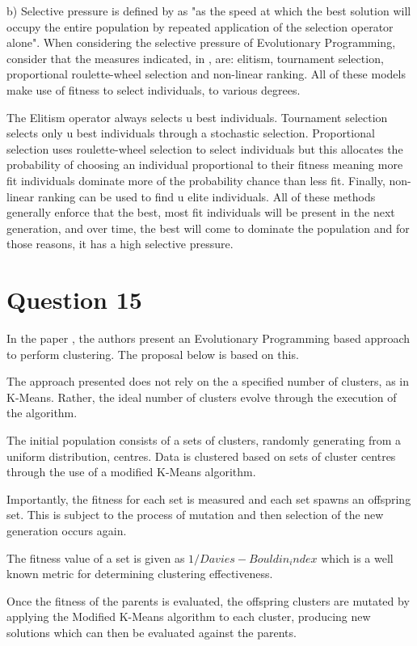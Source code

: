 \documentclass[12pt]{article}
\begin{document}
	b)  Selective pressure is defined by \cite{back_1994} as "as the speed at which the best solution will occupy the entire population by repeated application of the selection operator alone". When considering the selective pressure of Evolutionary Programming, consider that the measures indicated, in \cite{engelCI02}, are: elitism, tournament selection, proportional roulette-wheel selection and non-linear ranking.
	All of these models make use of fitness to select individuals, to various degrees.

	The Elitism operator always selects u best individuals. Tournament selection selects only u best individuals through a stochastic selection. Proportional selection uses roulette-wheel selection to select individuals but this allocates the probability of choosing an individual proportional to their fitness meaning more fit individuals dominate more of the probability chance than less fit. Finally, non-linear ranking can be used to find u elite individuals. All of these methods generally enforce that the best, most fit individuals will be present in the next generation, and over time, the best will come to dominate the population and for those reasons, it has a high selective pressure.
\section{Question 15}
In the paper \cite{549062}, the authors present an Evolutionary Programming based approach to perform clustering. The proposal below is based on this.

The approach presented does not rely on the a specified number of clusters, as in K-Means. Rather, the ideal number of clusters evolve through the execution of the algorithm.

The initial population consists of a sets of clusters, randomly generating from a uniform distribution, centres. Data is clustered based on sets of cluster centres through the use of a modified K-Means algorithm. 

Importantly, the fitness for each set is measured and each set spawns an offspring set. This is subject to the process of mutation and then selection of the new generation occurs again.

The fitness value of a set is given as $1/Davies-Bouldin_index$ \cite{4766909} which is a well known metric for determining clustering effectiveness.

Once the fitness of the parents is evaluated, the offspring clusters are mutated by applying the Modified K-Means algorithm to each cluster, producing new solutions which can then be evaluated against the parents.
\end{document}
